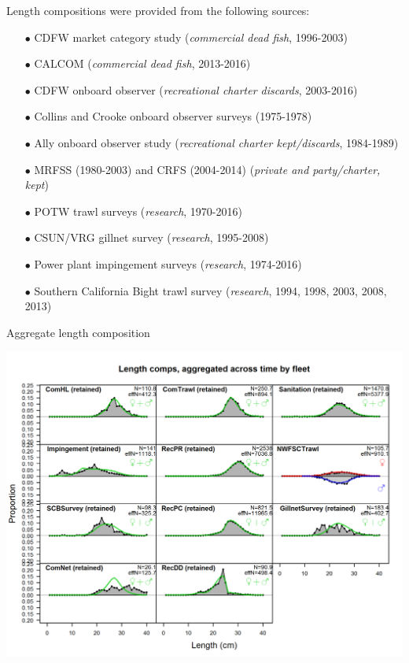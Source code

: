\documentclass[ignorenonframetext,compress]{beamer}
\begin{document}
\begin{frame}{Length compositions were provided from the following
sources:}

\begin{itemize}
  \item[$\bullet$] CDFW market category study (\emph{commercial dead fish}, 1996-2003)    
  \item[$\bullet$] CALCOM (\emph{commercial dead fish}, 2013-2016)    
  \item[$\bullet$] CDFW onboard observer (\emph{recreational charter discards}, 2003-2016)  
  \item[$\bullet$] Collins and Crooke onboard observer surveys (1975-1978) 
  \item[$\bullet$] Ally onboard observer study (\emph{recreational charter kept/discards}, 1984-1989)  
  \item[$\bullet$] MRFSS (1980-2003) and CRFS (2004-2014) (\emph{private and party/charter, kept})
  \item[$\bullet$] POTW trawl surveys (\emph{research}, 1970-2016)      
  \item[$\bullet$] CSUN/VRG gillnet survey (\emph{research}, 1995-2008)        
  \item[$\bullet$] Power plant impingement surveys (\emph{research}, 1974-2016)  
  \item[$\bullet$] Southern California Bight trawl survey (\emph{research}, 1994, 1998, 2003, 2008, 2013) 
\end{itemize}

\end{frame}

\begin{frame}{Aggregate length composition}

\includegraphics{r4ss/plots_mod1/comp_lenfit__aggregated_across_time.png}

\end{frame}
\end{document}

